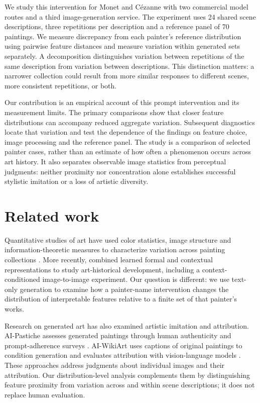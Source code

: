 \documentclass[11pt]{article}
\begin{document}
We study this intervention for Monet and C\'ezanne with two commercial model
routes and a third image-generation service. The experiment uses 24 shared scene
descriptions, three repetitions per description and a reference panel of 70
paintings. We measure discrepancy from each painter's reference distribution
using pairwise feature distances and measure variation within generated sets
separately. A decomposition distinguishes variation between repetitions of the
same description from variation between descriptions. This distinction matters:
a narrower collection could result from more similar responses to different
scenes, more consistent repetitions, or both.

Our contribution is an empirical account of this prompt intervention and its
measurement limits. The primary comparisons show that closer feature
distributions can accompany reduced aggregate variation. Subsequent diagnostics
locate that variation and test the dependence of the findings on feature choice,
image processing and the reference panel. The study is a comparison of selected
painter cases, rather than an estimate of how often a phenomenon occurs across
art history. It also separates observable image statistics from perceptual
judgments: neither proximity nor concentration alone establishes successful
stylistic imitation or a loss of artistic diversity.

\section{Related work}
Quantitative studies of art have used color statistics, image structure and
information-theoretic measures to characterize variation across painting
collections \citep{kim2014,sigaki2018,lee2020}. More recently,
\citet{kim2026} combined learned formal and contextual representations to study
art-historical development, including a context-conditioned image-to-image
experiment. Our question is different: we use text-only generation to examine
how a painter-name intervention changes the distribution of interpretable
features relative to a finite set of that painter's works.

Research on generated art has also examined artistic imitation and attribution.
AI-Pastiche assesses generated paintings through human authenticity and
prompt-adherence surveys \citep{asperti2025pastiche}. AI-WikiArt uses captions
of original paintings to condition generation and evaluates attribution with
vision-language models \citep{fu2025aiwikiart}. These approaches address judgments
about individual images and their attribution. Our distribution-level analysis
complements them by distinguishing feature proximity from variation across and
within scene descriptions; it does not replace human evaluation.
\end{document}

